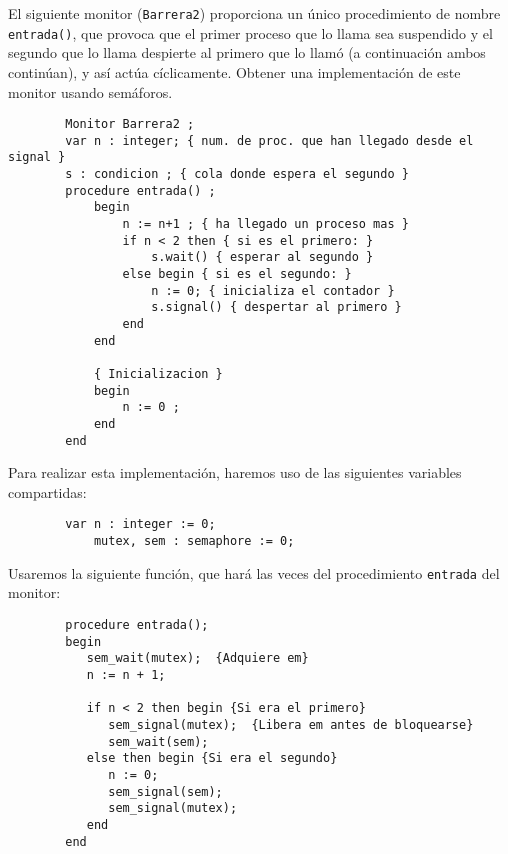 \begin{ejercicio}
    El siguiente monitor (\verb|Barrera2|) proporciona un único procedimiento de nombre \verb|entrada()|, que provoca que el primer proceso que lo llama sea suspendido y el segundo que lo llama despierte al primero que lo llamó (a continuación ambos continúan), y así actúa cíclicamente.
    Obtener una implementación de este monitor usando semáforos.
    \begin{verbatim}
        Monitor Barrera2 ;
        var n : integer; { num. de proc. que han llegado desde el signal }
        s : condicion ; { cola donde espera el segundo }
        procedure entrada() ;
            begin
                n := n+1 ; { ha llegado un proceso mas }
                if n < 2 then { si es el primero: }
                    s.wait() { esperar al segundo }
                else begin { si es el segundo: }
                    n := 0; { inicializa el contador }
                    s.signal() { despertar al primero }
                end
            end

            { Inicializacion }
            begin
                n := 0 ;
            end
        end
    \end{verbatim}
    Para realizar esta implementación, haremos uso de las siguientes variables compartidas:
    \begin{verbatim}
        var n : integer := 0;
            mutex, sem : semaphore := 0;
    \end{verbatim}
    Usaremos la siguiente función, que hará las veces del procedimiento \verb|entrada| del monitor:
    \begin{verbatim}
        procedure entrada();
        begin
           sem_wait(mutex);  {Adquiere em}
           n := n + 1;

           if n < 2 then begin {Si era el primero}
              sem_signal(mutex);  {Libera em antes de bloquearse}
              sem_wait(sem);
           else then begin {Si era el segundo}
              n := 0;
              sem_signal(sem);
              sem_signal(mutex);
           end
        end
    \end{verbatim}
\end{ejercicio}

